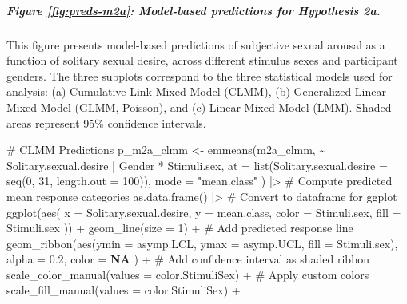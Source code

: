 \documentclass[
  bookmarksnumbered]{article}
\newenvironment{Shaded}{\begin{snugshade}}{\end{snugshade}}
\newcommand{\AttributeTok}[1]{\textcolor[rgb]{0.80,0.80,0.80}{#1}}
\newcommand{\CommentTok}[1]{\textcolor[rgb]{0.50,0.62,0.50}{#1}}
\newcommand{\ConstantTok}[1]{\textcolor[rgb]{0.86,0.64,0.64}{\textbf{#1}}}
\newcommand{\DecValTok}[1]{\textcolor[rgb]{0.86,0.86,0.80}{#1}}
\newcommand{\FloatTok}[1]{\textcolor[rgb]{0.75,0.75,0.82}{#1}}
\newcommand{\FunctionTok}[1]{\textcolor[rgb]{0.94,0.94,0.56}{#1}}
\newcommand{\NormalTok}[1]{\textcolor[rgb]{0.80,0.80,0.80}{#1}}
\newcommand{\OtherTok}[1]{\textcolor[rgb]{0.94,0.94,0.56}{#1}}
\newcommand{\SpecialCharTok}[1]{\textcolor[rgb]{0.86,0.64,0.64}{#1}}
\newcommand{\StringTok}[1]{\textcolor[rgb]{0.80,0.58,0.58}{#1}}
\begin{document}
\subparagraph{Figure \ref{fig:preds-m2a}: Model-based predictions for Hypothesis 2a.}\label{figure-reffigpreds-m2a-model-based-predictions-for-hypothesis-2a.}

This figure presents model-based predictions of subjective sexual arousal as a function of solitary sexual desire, across different stimulus sexes and participant genders. The three subplots correspond to the three statistical models used for analysis: (a) Cumulative Link Mixed Model (CLMM), (b) Generalized Linear Mixed Model (GLMM, Poisson), and (c) Linear Mixed Model (LMM). Shaded areas represent 95\% confidence intervals.

\begin{Shaded}
\begin{Highlighting}[]
\CommentTok{\# CLMM Predictions}
\NormalTok{p\_m2a\_clmm }\OtherTok{\textless{}{-}} \FunctionTok{emmeans}\NormalTok{(m2a\_clmm, }\SpecialCharTok{\textasciitilde{}}\NormalTok{ Solitary.sexual.desire }\SpecialCharTok{|}\NormalTok{ Gender }\SpecialCharTok{*}\NormalTok{ Stimuli.sex,}
  \AttributeTok{at =} \FunctionTok{list}\NormalTok{(}\AttributeTok{Solitary.sexual.desire =} \FunctionTok{seq}\NormalTok{(}\DecValTok{0}\NormalTok{, }\DecValTok{31}\NormalTok{, }\AttributeTok{length.out =} \DecValTok{100}\NormalTok{)),}
  \AttributeTok{mode =} \StringTok{"mean.class"}
\NormalTok{) }\SpecialCharTok{|\textgreater{}} \CommentTok{\# Compute predicted mean response categories}
  \FunctionTok{as.data.frame}\NormalTok{() }\SpecialCharTok{|\textgreater{}} \CommentTok{\# Convert to dataframe for ggplot}
  \FunctionTok{ggplot}\NormalTok{(}\FunctionTok{aes}\NormalTok{(}
    \AttributeTok{x =}\NormalTok{ Solitary.sexual.desire, }\AttributeTok{y =}\NormalTok{ mean.class,}
    \AttributeTok{color =}\NormalTok{ Stimuli.sex, }\AttributeTok{fill =}\NormalTok{ Stimuli.sex}
\NormalTok{  )) }\SpecialCharTok{+}
  \FunctionTok{geom\_line}\NormalTok{(}\AttributeTok{size =} \DecValTok{1}\NormalTok{) }\SpecialCharTok{+} \CommentTok{\# Add predicted response line}
  \FunctionTok{geom\_ribbon}\NormalTok{(}\FunctionTok{aes}\NormalTok{(}\AttributeTok{ymin =}\NormalTok{ asymp.LCL, }\AttributeTok{ymax =}\NormalTok{ asymp.UCL, }\AttributeTok{fill =}\NormalTok{ Stimuli.sex),}
    \AttributeTok{alpha =} \FloatTok{0.2}\NormalTok{, }\AttributeTok{color =} \ConstantTok{NA}
\NormalTok{  ) }\SpecialCharTok{+} \CommentTok{\# Add confidence interval as shaded ribbon}
  \FunctionTok{scale\_color\_manual}\NormalTok{(}\AttributeTok{values =}\NormalTok{ color.StimuliSex) }\SpecialCharTok{+} \CommentTok{\# Apply custom colors}
  \FunctionTok{scale\_fill\_manual}\NormalTok{(}\AttributeTok{values =}\NormalTok{ color.StimuliSex) }\SpecialCharTok{+}

\end{Highlighting}
\end{Shaded}
\end{document}
